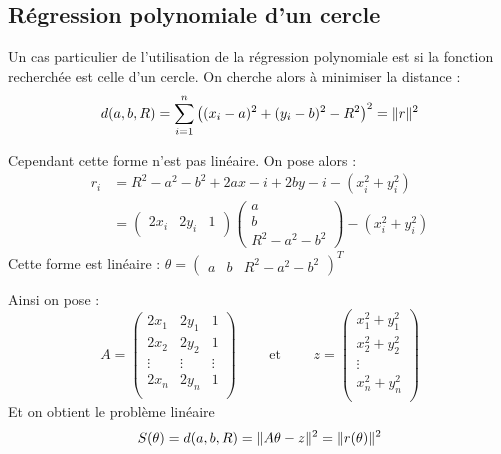 	\subsection{Régression polynomiale d'un cercle}

		Un cas particulier de l'utilisation de la régression polynomiale est si la fonction recherchée est celle d'un cercle.
		On cherche alors à minimiser la distance  :
		\begin{equation}
			\label{eq-5-dcercle}
			d(a,b,R) = \sum_{i=1}^n \left( (x_i - a)^2 + (y_i - b)^2 -R^2 \right)^2 = \lVert r \rVert^2
		\end{equation}

		Cependant cette forme n'est pas linéaire. On pose alors :
		\begin{align*}
			r_i &= R^2 - a^2 - b^2 + 2ax-i + 2by-i - (x_i^2 + y_i^2) \\
				&= 	\begin{pmatrix}
						2x_i & 2y_i & 1
					\end{pmatrix}
					\begin{pmatrix}
						a \\
						b \\
						R^2 -a^2 - b^2
					\end{pmatrix}
					- (x_i^2 + y_i^2)
		\end{align*}
		Cette forme est linéaire : $\theta = \begin{pmatrix} a & b & R^2 -a^2 - b^2 \end{pmatrix}^T$

		Ainsi on pose :
		$$
			A = \begin{pmatrix}
					2x_1 & 2y_1 & 1	\\
					2x_2 & 2y_2 & 1	\\
					\vdots & \vdots & \vdots \\
					2x_n & 2y_n & 1	\\
				\end{pmatrix}
			\qquad\text{ et }\qquad
			z = \begin{pmatrix}
					x_1^2 + y_1^2 \\
					x_2^2 + y_2^2 \\
					\vdots \\
					x_n^2 + y_n^2 \\
				\end{pmatrix}
		$$
		Et on obtient le problème linéaire 
		\begin{equation}
			\label{eq-5-cercleS}
			S(\theta) = d(a,b,R) = \lVert A\theta - z \rVert^2 = \lVert r(\theta) \rVert^2
		\end{equation}
		

